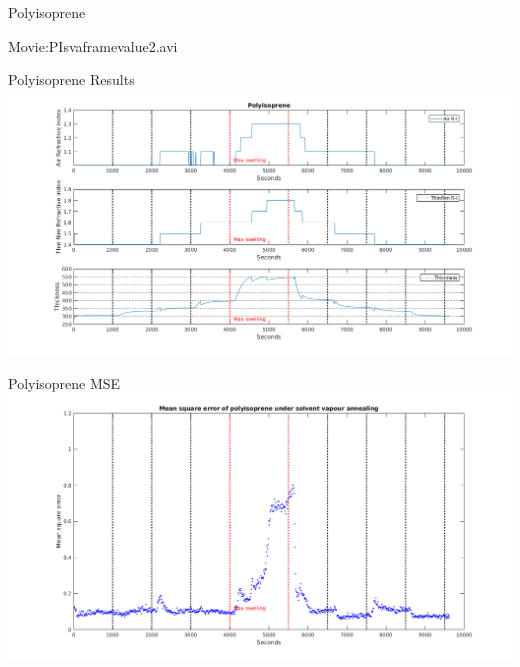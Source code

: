 \documentclass[10pt]{beamer}
\begin{document}
\begin{frame}{Polyisoprene}
\begin{center}
\Huge Movie:PIsvaframevalue2.avi
\end{center}
\end{frame}

\begin{frame}{Polyisoprene Results}
\includegraphics[width=\textwidth]{PIswelling1.png}
\end{frame}

\begin{frame}{Polyisoprene MSE}
\includegraphics[width=\textwidth]{PIswelling2.png}
\end{frame}
\end{document}
